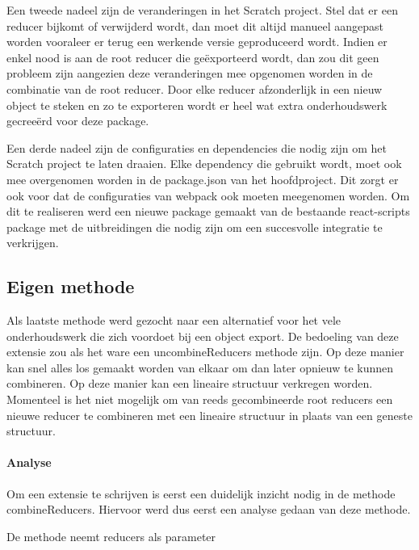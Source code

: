 Een tweede nadeel zijn de veranderingen in het Scratch project. Stel dat er een reducer bijkomt of verwijderd wordt, dan moet dit altijd manueel aangepast worden vooraleer er terug een werkende versie geproduceerd wordt. Indien er enkel nood is aan de root reducer die geëxporteerd wordt, dan zou dit geen probleem zijn aangezien deze veranderingen mee opgenomen worden in de combinatie van de root reducer. Door elke reducer afzonderlijk in een nieuw object te steken en zo te exporteren wordt er heel wat extra onderhoudswerk gecreeërd voor deze package.  

Een derde nadeel zijn de configuraties en dependencies die nodig zijn om het Scratch project te laten draaien. 
Elke dependency die gebruikt wordt, moet ook mee overgenomen worden in de package.json van het hoofdproject. Dit zorgt er ook voor dat de configuraties van webpack ook moeten meegenomen worden. Om dit te realiseren werd een nieuwe package gemaakt van de bestaande react-scripts package met de uitbreidingen die nodig zijn om een succesvolle integratie te verkrijgen.

\subsection{Eigen methode}
Als laatste methode werd gezocht naar een alternatief voor het vele onderhoudswerk die zich voordoet bij een object export. De bedoeling van deze extensie zou als het ware een uncombineReducers methode zijn. Op deze manier kan snel alles los gemaakt worden van elkaar om dan later opnieuw te kunnen combineren. Op deze manier kan een lineaire structuur verkregen worden. Momenteel is het niet mogelijk om van reeds gecombineerde root reducers een nieuwe reducer te combineren met een lineaire structuur in plaats van een geneste structuur. 

\paragraph{Analyse}
Om een extensie te schrijven is eerst een duidelijk inzicht nodig in de methode combineReducers. Hiervoor werd dus eerst een analyse gedaan van deze methode. 

De methode neemt reducers als parameter


